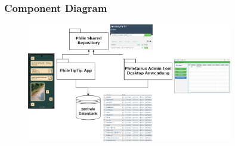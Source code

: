 \begin{frame}
\frametitle{Component Diagram}

\begin{figure}
  \includegraphics[width=0.8\textwidth]{figures/Component_Diagramm.drawio.png}
  \label{fig:component}
\end{figure}

\end{frame}




